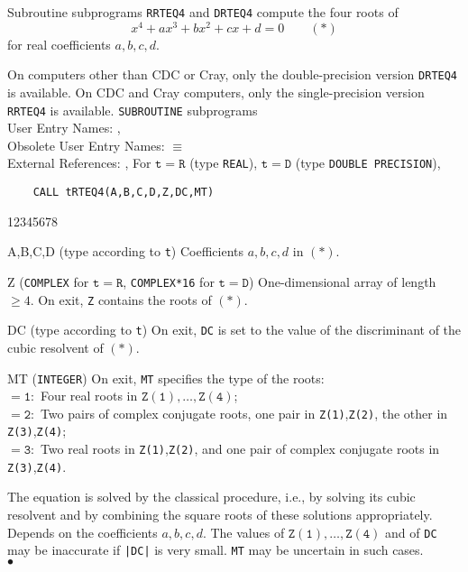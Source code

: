                           
                   
\Submitter{}                            
                      
Subroutine subprograms {\tt RRTEQ4} and  {\tt DRTEQ4}
compute the four roots of
  $$ x^4 + ax^3 + bx^2 + cx + d = 0 \qquad        (*)   $$
for real coefficients $a,b,c,d$.
\par
On computers other than CDC or Cray, only the double-precision version
{\tt DRTEQ4} is available. On CDC and Cray computers, only the
single-precision version {\tt RRTEQ4} is available.
\Structure
{\tt SUBROUTINE} subprograms\\
User Entry Names:  , \\
Obsolete User Entry Names:  $\equiv$  \\
External References: , 
\Usage
For $\mathtt{t=R}$ (type {\tt REAL}), $\mathtt{t=D}$ (type
{\tt DOUBLE PRECISION}),
\begin{verbatim}
    CALL tRTEQ4(A,B,C,D,Z,DC,MT)
\end{verbatim}
\begin{DLtt}{12345678}
\item[A,B,C,D] (type according to {\tt t})
Coefficients $a,b,c,d$ in $(*)$.
\item[Z] ({\tt COMPLEX} for $\mathtt{t=R}$, {\tt COMPLEX*16} for
$\mathtt{t=D}$) One-dimensional array of length $\ge 4$. On exit,
{\tt Z} contains the roots of $(*)$.
\item[DC] (type according to {\tt t}) On exit, {\tt DC} is set to
the value of the discriminant of the cubic resolvent of $(*)$.
\item[MT] ({\tt INTEGER})
On exit, {\tt MT} specifies the type of the roots: \\
$\mathtt{= 1:}$ Four real roots in $\mathtt{Z(1)},\ldots,
\mathtt{Z(4)}$; \\
$\mathtt{= 2:}$ Two pairs of complex conjugate roots, one pair in
{\tt Z(1)},{\tt Z(2)}, the other in {\tt Z(3)},{\tt Z(4)}; \\
$\mathtt{= 3:}$ Two real roots in {\tt Z(1)},{\tt Z(2)}, and one pair
of complex conjugate roots in {\tt Z(3)},{\tt Z(4)}.
\end{DLtt}
\Method
The equation is solved by the classical procedure, i.e., by
solving its cubic resolvent and by combining the square roots
of these solutions appropriately.
\Accuracy
Depends on the coefficients $a,b,c,d$. The values of
$\mathtt{Z(1)},\ldots,\mathtt{Z(4)}$ and of {\tt DC} may be inaccurate if
{\tt |DC|} is very small. {\tt MT} may be uncertain in such cases.
\\ $\bullet$
